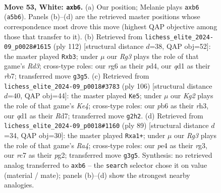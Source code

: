 \documentclass[11pt]{article}
\begin{document}
\clearpage

\begin{figure}[p]\centering
\begin{subfigure}{0.46\textwidth}\centering
\resizebox{\linewidth}{!}{%
\newchessgame
\chessboard[
  setfen={8/2r3pk/1p4r1/P7/3pp3/6R1/5PK1/3q4 w - - 0 53},
  showmover=false,
  pgfstyle=straightmove, color=movearrow, markmove={a5-b6}
]}
\caption{}
\end{subfigure}\hfill
\begin{subfigure}{0.46\textwidth}\centering
\resizebox{\linewidth}{!}{%
\newchessgame
\chessboard[
  setfen={8/1r6/4p3/2k1P3/1p1p4/1r1R1K2/5P2/8 w - - 0 57},
  showmover=false,
  pgfstyle=straightmove, color=movearrow, markmove={d3-b3}
]}
\caption{}
\end{subfigure}
\\[4pt]
\begin{subfigure}{0.46\textwidth}\centering
\resizebox{\linewidth}{!}{%
\newchessgame
\chessboard[
  setfen={8/3R1pk1/5rp1/7p/4KR1P/4P2r/8/8 w - - 2 54},
  showmover=false,
  pgfstyle=straightmove, color=movearrow, markmove={e4-e5}
]}
\caption{}
\end{subfigure}\hfill
\begin{subfigure}{0.46\textwidth}\centering
\resizebox{\linewidth}{!}{%
\newchessgame
\chessboard[
  setfen={6rk/6p1/1p5p/r7/3PQ3/2P3R1/6P1/R5K1 b - - 0 45},
  showmover=false,
  pgfstyle=straightmove, color=movearrow, markmove={a5-a1}
]}
\caption{}
\end{subfigure}
\caption{\textbf{Move 53, White: \texttt{axb6}.} (a) Our position; Melanie plays \texttt{axb6} (\texttt{a5b6}). Panels (b)--(d) are the retrieved master positions whose correspondence most drove this move (highest QAP objective among those that transfer to it). (b) Retrieved from \texttt{lichess\_elite\_2024-09\_p0028\#1615} (ply 112) [structural distance $d$=38, QAP obj=52]: the master played \texttt{Rxb3}; under $\mu$ our \emph{Rg3} plays the role of that game's \emph{Rd3}; cross-type roles: our \emph{r}g6 as their \emph{p}d4, our \emph{q}d1 as their \emph{r}b7; transferred move \texttt{g3g5}. (c) Retrieved from \texttt{lichess\_elite\_2024-09\_p0018\#3783} (ply 106) [structural distance $d$=40, QAP obj=44]: the master played \texttt{Ke5}; under $\mu$ our \emph{Kg2} plays the role of that game's \emph{Ke4}; cross-type roles: our \emph{p}b6 as their \emph{r}h3, our \emph{q}d1 as their \emph{R}d7; transferred move \texttt{g2h2}. (d) Retrieved from \texttt{lichess\_elite\_2024-09\_p0018\#1160} (ply 89) [structural distance $d$=34, QAP obj=30]: the master played \texttt{Rxa1+}; under $\mu$ our \emph{Rg3} plays the role of that game's \emph{Ra4}; cross-type roles: our \emph{p}e4 as their \emph{r}g3, our \emph{r}c7 as their \emph{p}g2; transferred move \texttt{g3g5}. Synthesis: no retrieved analog transferred to \texttt{axb6} -- the \texttt{search} selector chose it on value (material / mate); panels (b)--(d) show the strongest nearby analogies.}
\label{fig:thought-m104}
\end{figure}
\end{document}
